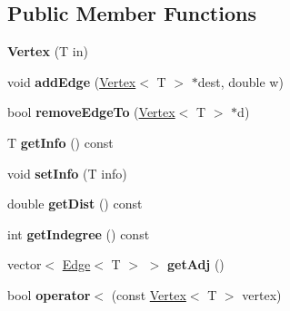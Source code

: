 \subsection*{Public Member Functions}
\begin{DoxyCompactItemize}
\item 
\hypertarget{class_vertex_afcbdd4d4198b672356559cb8fa088408}{}{\bfseries Vertex} (T in)\label{class_vertex_afcbdd4d4198b672356559cb8fa088408}

\item 
\hypertarget{class_vertex_aeb024eced2da142912f189af6a454db3}{}void {\bfseries add\+Edge} (\hyperlink{class_vertex}{Vertex}$<$ T $>$ $\ast$dest, double w)\label{class_vertex_aeb024eced2da142912f189af6a454db3}

\item 
\hypertarget{class_vertex_ab2b5b43fb1709a901b78718436763a84}{}bool {\bfseries remove\+Edge\+To} (\hyperlink{class_vertex}{Vertex}$<$ T $>$ $\ast$d)\label{class_vertex_ab2b5b43fb1709a901b78718436763a84}

\item 
\hypertarget{class_vertex_a5880b4b252ae6818819c2f9645784b59}{}T {\bfseries get\+Info} () const \label{class_vertex_a5880b4b252ae6818819c2f9645784b59}

\item 
\hypertarget{class_vertex_a31cd60c26640f8072a928ba70eb2f95e}{}void {\bfseries set\+Info} (T info)\label{class_vertex_a31cd60c26640f8072a928ba70eb2f95e}

\item 
\hypertarget{class_vertex_a5c5b34281128297a4824b1c377d2b788}{}double {\bfseries get\+Dist} () const \label{class_vertex_a5c5b34281128297a4824b1c377d2b788}

\item 
\hypertarget{class_vertex_a305ef01582f945f22134abb9294fe1f3}{}int {\bfseries get\+Indegree} () const \label{class_vertex_a305ef01582f945f22134abb9294fe1f3}

\item 
\hypertarget{class_vertex_aa8f7822976771f28e9a37199bcab69aa}{}vector$<$ \hyperlink{class_edge}{Edge}$<$ T $>$ $>$ {\bfseries get\+Adj} ()\label{class_vertex_aa8f7822976771f28e9a37199bcab69aa}

\item 
\hypertarget{class_vertex_a7091b26f281a5041b1775a3d3f9cb7a6}{}bool {\bfseries operator$<$} (const \hyperlink{class_vertex}{Vertex}$<$ T $>$ vertex)\label{class_vertex_a7091b26f281a5041b1775a3d3f9cb7a6}

\end{DoxyCompactItemize}
